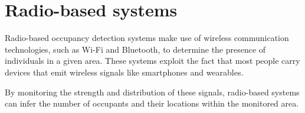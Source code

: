 


\section{Radio-based systems}\label{sec:presence_radio}
Radio-based occupancy detection systems make use of wireless communication technologies, such as Wi-Fi and Bluetooth, to determine the presence of individuals in a given area.
These systems exploit the fact that most people carry devices that emit wireless signals like smartphones and wearables.

By monitoring the strength and distribution of these signals, radio-based systems can infer the number of occupants and their locations within the monitored area.\cite{longoAccurateOccupancyEstimation2019}

